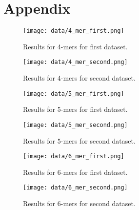 \section*{Appendix}
\begin{figure}[ht]
    \centering
    \texttt{[image: data/4\_mer\_first.png]}
    \caption{Results for 4-mers for first dataset.}
\end{figure}

\begin{figure}[ht]
    \centering
    \texttt{[image: data/4\_mer\_second.png]}
    \caption{Results for 4-mers for second dataset.}
\end{figure}

\begin{figure}[ht]
    \centering
    \texttt{[image: data/5\_mer\_first.png]}
    \caption{Results for 5-mers for first dataset.}
\end{figure}

\begin{figure}[ht]
    \centering
    \texttt{[image: data/5\_mer\_second.png]}
    \caption{Results for 5-mers for second dataset.}
\end{figure}

\begin{figure}[ht]
    \centering
    \texttt{[image: data/6\_mer\_first.png]}
    \caption{Results for 6-mers for first dataset.}
\end{figure}

\begin{figure}[ht]
    \centering
    \texttt{[image: data/6\_mer\_second.png]}
    \caption{Results for 6-mers for second dataset.}
\end{figure}
